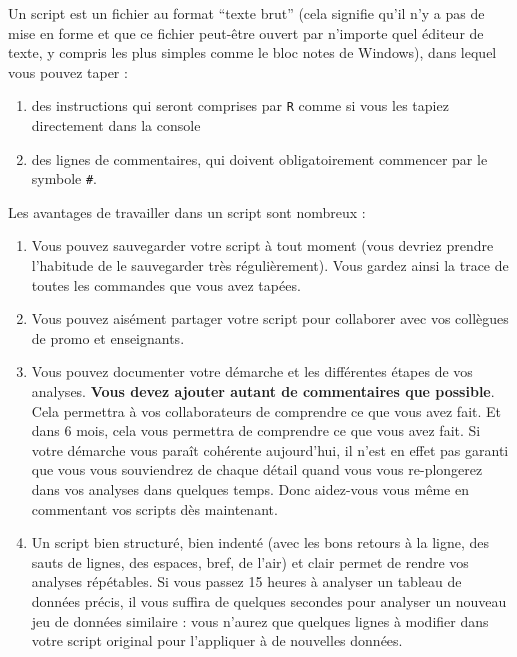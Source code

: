 \documentclass[
  a4paper,
  DIV=11,
  numbers=noendperiod,
  oneside]{scrreprt}
\providecommand{\tightlist}{%
  \setlength{\itemsep}{0pt}\setlength{\parskip}{0pt}}\usepackage{longtable,booktabs,array}
\begin{document}
\begin{tcolorbox}[enhanced jigsaw, arc=.35mm, opacityback=0, colbacktitle=quarto-callout-important-color!10!white, bottomrule=.15mm, coltitle=black, colframe=quarto-callout-important-color-frame, breakable, toprule=.15mm, title=\textcolor{quarto-callout-important-color}{\faExclamation}\hspace{0.5em}{Définition importante !}, leftrule=.75mm, titlerule=0mm, bottomtitle=1mm, toptitle=1mm, left=2mm, rightrule=.15mm, opacitybacktitle=0.6, colback=white]

Un script est un fichier au format ``texte brut'' (cela signifie qu'il
n'y a pas de mise en forme et que ce fichier peut-être ouvert par
n'importe quel éditeur de texte, y compris les plus simples comme le
bloc notes de Windows), dans lequel vous pouvez taper :

\begin{enumerate}
\def\labelenumi{\arabic{enumi}.}
\tightlist
\item
  des instructions qui seront comprises par \texttt{R} comme si vous les
  tapiez directement dans la console
\item
  des lignes de commentaires, qui doivent obligatoirement commencer par
  le symbole \texttt{\#}.
\end{enumerate}

\end{tcolorbox}

Les avantages de travailler dans un script sont nombreux :

\begin{enumerate}
\def\labelenumi{\arabic{enumi}.}
\tightlist
\item
  Vous pouvez sauvegarder votre script à tout moment (vous devriez
  prendre l'habitude de le sauvegarder très régulièrement). Vous gardez
  ainsi la trace de toutes les commandes que vous avez tapées.
\item
  Vous pouvez aisément partager votre script pour collaborer avec vos
  collègues de promo et enseignants.
\item
  Vous pouvez documenter votre démarche et les différentes étapes de vos
  analyses. \textbf{Vous devez ajouter autant de commentaires que
  possible}. Cela permettra à vos collaborateurs de comprendre ce que
  vous avez fait. Et dans 6 mois, cela vous permettra de comprendre ce
  que vous avez fait. Si votre démarche vous paraît cohérente
  aujourd'hui, il n'est en effet pas garanti que vous vous souviendrez
  de chaque détail quand vous vous re-plongerez dans vos analyses dans
  quelques temps. Donc aidez-vous vous même en commentant vos scripts
  dès maintenant.
\item
  Un script bien structuré, bien indenté (avec les bons retours à la
  ligne, des sauts de lignes, des espaces, bref, de l'air) et clair
  permet de rendre vos analyses répétables. Si vous passez 15 heures à
  analyser un tableau de données précis, il vous suffira de quelques
  secondes pour analyser un nouveau jeu de données similaire : vous
  n'aurez que quelques lignes à modifier dans votre script original pour
  l'appliquer à de nouvelles données.
\end{enumerate}
\end{document}
